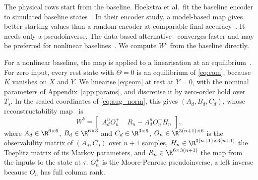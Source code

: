 The physical rows start from the baseline.
Hoekstra et al.\ fit the baseline encoder to simulated baseline
states~\cite[Eq.~(30)]{hoekstra2026lfr}.
In their encoder study, a model-based map gives better starting values than
a random encoder at comparable final
accuracy~\cite[Sec.~4.4]{hoekstra2026encoder}.
It needs only a pseudoinverse.
The data-based alternative~\cite[Sec.~3.2]{hoekstra2026encoder} converges
faster and may be preferred for nonlinear
baselines~\cite[Sec.~4.4]{hoekstra2026encoder}.
We compute $W^b$ from the baseline directly.

For a nonlinear baseline, the map is applied to a linearisation at an
equilibrium~\cite[Eqs.~(30) to (32)]{hoekstra2026encoder}.
For zero input, every rest state with $\Theta=0$ is an equilibrium of
\eqref{eq:eom}, because $K$ vanishes on $X$ and $Y$.
We linearise \eqref{eq:eom} at rest at $Y=0$, with the nominal parameters of
Appendix~\ref{app:params}, and discretise it by zero-order hold over $T_s$.
In the scaled coordinates of \eqref{eq:aug_norm}, this gives
$(A_d,B_d,C_d)$, whose reconstructability
map~\cite[Eqs.~(16), (17)]{hoekstra2026encoder} is
\begin{equation}
 W^b=\begin{bmatrix}
  A_d^nO_n^{+} & \;R_n-A_d^nO_n^{+}H_n
 \end{bmatrix},
 \label{eq:aug_wb}
\end{equation}
where $A_d\in\R^{6\times6}$, $B_d\in\R^{6\times3}$ and $C_d\in\R^{3\times6}$,
$O_n\in\R^{3(n+1)\times6}$ is the observability matrix of $(A_d,C_d)$ over
$n+1$ samples, $H_n\in\R^{3(n+1)\times3(n+1)}$ the Toeplitz matrix of its
Markov parameters, and $R_n\in\R^{6\times3(n+1)}$ the map from the inputs to
the state at $\tau$.
$O_n^{+}$ is the Moore-Penrose pseudoinverse, a left inverse because $O_n$ has
full column rank.

